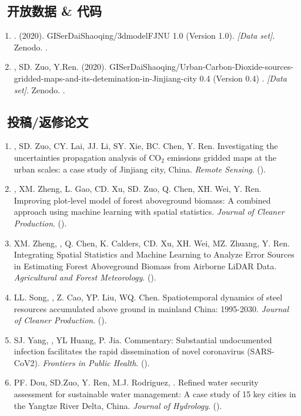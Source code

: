 \subsection*{\texorpdfstring{\faBook\ 开放数据 \& 代码}{开放数据 \& 代码}}
\begin{enumerate}
\item
   \Shaoqing. (2020).
    GISerDaiShaoqing/3dmodelFJNU 1.0 (Version 1.0).
    \textit{[Data set]}. Zenodo. 
    .
\item
   \Shaoqing, SD. Zuo, Y.Ren. (2020).
    GISerDaiShaoqing/Urban-Carbon-Dioxide-sources-gridded-maps-and-its-detemination-in-Jinjiang-city 0.4 (Version 0.4) .
    \textit{[Data set]}. Zenodo. 
    .
\end{enumerate}

\subsection*{\texorpdfstring{\faBook\ 投稿/返修论文}{投稿/返修论文}}
\begin{enumerate}
\item
    \Shaoqing, SD. Zuo, CY. Lai, JJ. Li, SY. Xie, BC. Chen, Y. Ren.
     Investigating the uncertainties propagation analysis of CO$_2$ emissions gridded maps at the urban scales: a case study of Jinjiang city, China.  
   \textit{Remote Sensing}.
    (\Submitted).
\item
    \Shaoqing\CF, XM. Zheng, L. Gao, CD. Xu, SD. Zuo, Q. Chen, XH. Wei, Y. Ren.
    Improving plot-level model of forest aboveground biomass: A combined approach using machine learning with spatial statistics.
    \textit{Journal of Cleaner Production}. 
    (\Review).
\item
    XM. Zheng, \Shaoqing, Q. Chen, K. Calders, CD. Xu, XH. Wei, MZ. Zhuang, Y. Ren.
    Integrating Spatial Statistics and Machine Learning to Analyze Error Sources in Estimating Forest Aboveground Biomass from Airborne LiDAR Data.
    \textit{Agricultural and Forest Meteorology}. 
    (\Review).
\item
    LL. Song, \Shaoqing, Z. Cao, YP. Liu, WQ. Chen.
    Spatiotemporal dynamics of steel resources accumulated above ground in mainland China: 1995-2030.
    \textit{Journal of Cleaner Production}. 
    (\Revision).
\item
    SJ. Yang, \Shaoqing, YL Huang, P. Jia.
    Commentary: Substantial undocumented infection facilitates the rapid dissemination of novel coronavirus (SARS-CoV2).
    \textit{Frontiers in Public Health}. 
    (\Review).
\item
    PF. Dou, SD.Zuo, Y. Ren, M.J. Rodriguez, \Shaoqing.
    Refined water security assessment for sustainable water management: A case study of 15 key cities in the Yangtze River Delta, China.
    \textit{Journal of Hydrology}.
    (\Revision).
\end{enumerate}
